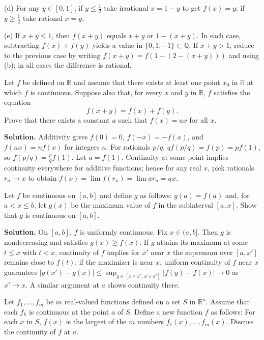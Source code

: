 (d) For any $y\in[0,1]$, if $y\le \tfrac12$ take irrational $x=1-y$ to get $f(x)=y$; if $y\ge \tfrac12$ take rational $x=y$.

(e) If $x+y\le 1$, then $f(x+y)$ equals $x+y$ or $1-(x+y)$. In each case, subtracting $f(x)+f(y)$ yields a value in $\{0,1,-1\}\subset \mathbb{Q}$. If $x+y>1$, reduce to the previous case by writing $f(x+y)=f(1-(2-(x+y)))$ and using (b); in all cases the difference is rational.
\medskip

\begin{problembox}
Let \( f \) be defined on \( \mathbb{R} \) and assume that there exists at least one point \( x_0 \) in \( \mathbb{R} \) at which \( f \) is continuous. Suppose also that, for every \( x \) and \( y \) in \( \mathbb{R} \), \( f \) satisfies the equation
\[f(x + y) = f(x) + f(y).\]
Prove that there exists a constant \( a \) such that \( f(x) = ax \) for all \( x \).
\end{problembox}

\noindent\textbf{Solution.}
Additivity gives $f(0)=0$, $f(-x)=-f(x)$, and $f(nx)=nf(x)$ for integers $n$. For rationals $p/q$, $qf(p/q)=f(p)=pf(1)$, so $f(p/q)=\tfrac{p}{q}f(1)$. Let $a=f(1)$. Continuity at some point implies continuity everywhere for additive functions; hence for any real $x$, pick rationals $r_n\to x$ to obtain $f(x)=\lim f(r_n)=\lim ar_n=ax$.
\medskip

\begin{problembox}
Let \( f \) be continuous on \([a, b]\) and define \( g \) as follows: \( g(a) = f(a) \) and, for \( a < x \leq b \), let \( g(x) \) be the maximum value of \( f \) in the subinterval \([a, x]\). Show that \( g \) is continuous on \([a, b]\).
\end{problembox}

\noindent\textbf{Solution.}
On $[a,b]$, $f$ is uniformly continuous. Fix $x\in(a,b]$. Then $g$ is nondecreasing and satisfies $g(x)\ge f(x)$. If $g$ attains its maximum at some $t\le x$ with $t<x$, continuity of $f$ implies for $x'$ near $x$ the supremum over $[a,x']$ remains close to $f(t)$; if the maximizer is near $x$, uniform continuity of $f$ near $x$ guarantees $|g(x')-g(x)|\le \sup_{y\in[x\wedge x',\,x\vee x']}|f(y)-f(x)|\to 0$ as $x'\to x$. A similar argument at $a$ shows continuity there.
\medskip

\begin{problembox}
Let \( f_1, \ldots, f_m \) be \( m \) real-valued functions defined on a set \( S \) in \( \mathbb{R}^n \). Assume that each \( f_k \) is continuous at the point \( a \) of \( S \). Define a new function \( f \) as follows: For each \( x \) in \( S \), \( f(x) \) is the largest of the \( m \) numbers \( f_1(x), \ldots, f_m(x) \). Discuss the continuity of \( f \) at \( a \).
\end{problembox}

